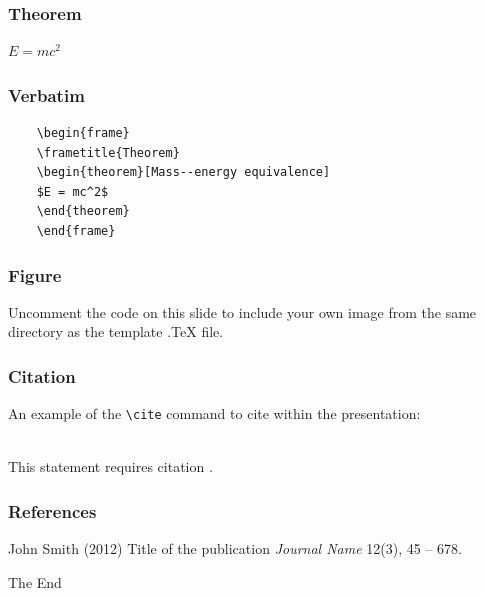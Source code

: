 \documentclass[9pt]{beamer}
\begin{document}

	\begin{frame}
	\frametitle{Theorem}
	\begin{theorem}
	$E = mc^2$
	\end{theorem}
	\end{frame}


	\begin{frame}[fragile] %
	\frametitle{Verbatim}
	\begin{example}
	\begin{verbatim}
	\begin{frame}
	\frametitle{Theorem}
	\begin{theorem}[Mass--energy equivalence]
	$E = mc^2$
	\end{theorem}
	\end{frame}\end{verbatim}
	\end{example}
	\end{frame}


	\begin{frame}
	\frametitle{Figure}
	Uncomment the code on this slide to include your own image from the same directory as the template .TeX file.
	\end{frame}


	\begin{frame}[fragile] %
	\frametitle{Citation}
	An example of the \verb|\cite| command to cite within the presentation:\\~

	This statement requires citation \cite{p1}.
	\end{frame}


	\begin{frame}
	\frametitle{References}
	\footnotesize{
	\begin{thebibliography}{99} %
	 John Smith (2012)
	\newblock Title of the publication
	\newblock \emph{Journal Name} 12(3), 45 -- 678.
	\end{thebibliography}
	}
	\end{frame}


	\begin{frame}
	\Huge{\centerline{The End}}
	\end{frame}

\end{document}
